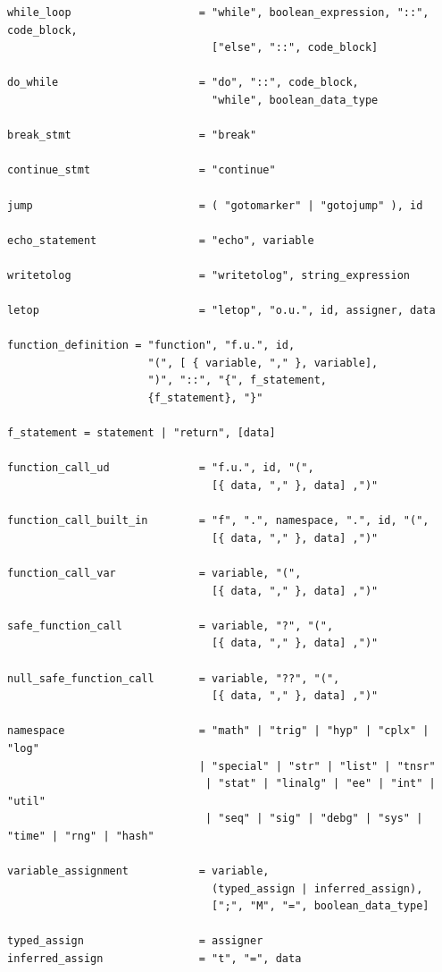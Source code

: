 \begin{verbatim}
while_loop                    = "while", boolean_expression, "::", code_block,
                                ["else", "::", code_block]

do_while                      = "do", "::", code_block,
                                "while", boolean_data_type

break_stmt                    = "break"

continue_stmt                 = "continue"

jump                          = ( "gotomarker" | "gotojump" ), id

echo_statement                = "echo", variable

writetolog                    = "writetolog", string_expression

letop                         = "letop", "o.u.", id, assigner, data

function_definition = "function", "f.u.", id, 
                      "(", [ { variable, "," }, variable], 
                      ")", "::", "{", f_statement, 
                      {f_statement}, "}"

f_statement = statement | "return", [data]

function_call_ud              = "f.u.", id, "(",
                                [{ data, "," }, data] ,")"

function_call_built_in        = "f", ".", namespace, ".", id, "(",
                                [{ data, "," }, data] ,")"

function_call_var             = variable, "(",
                                [{ data, "," }, data] ,")"

safe_function_call            = variable, "?", "(",
                                [{ data, "," }, data] ,")"

null_safe_function_call       = variable, "??", "(",
                                [{ data, "," }, data] ,")"

namespace                     = "math" | "trig" | "hyp" | "cplx" | "log"
                              | "special" | "str" | "list" | "tnsr"
                               | "stat" | "linalg" | "ee" | "int" | "util"
                               | "seq" | "sig" | "debg" | "sys" | "time" | "rng" | "hash"

variable_assignment           = variable,
                                (typed_assign | inferred_assign),
                                [";", "M", "=", boolean_data_type]

typed_assign                  = assigner
inferred_assign               = "t", "=", data


\end{verbatim}
